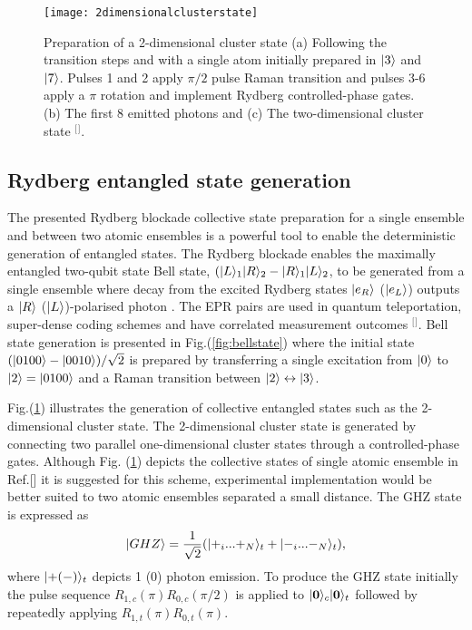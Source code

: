 \begin{figure}[t]
\centering
\texttt{[image: 2dimensionalclusterstate]}
\caption{\label{fig:2dimensionalclusterstate} Preparation of a 2-dimensional cluster state (a) Following the transition steps and with a single atom initially prepared in $\lvert3\rangle$ and $\lvert7\rangle$. Pulses 1 and 2 apply $\pi/2$ pulse Raman transition and pulses 3-6 apply a $\pi$ rotation and implement Rydberg controlled-phase gates. (b) The first 8 emitted photons and (c) The two-dimensional cluster state $^{[}$\citep{Nielsen2010DeterministicProcessing}$^{]}$.}
\end{figure} 

\subsection{Rydberg entangled state generation}

The presented Rydberg blockade collective state preparation for a single ensemble and between two atomic ensembles is a powerful tool to enable the deterministic generation of entangled states. The Rydberg blockade enables the maximally entangled two-qubit state Bell state, $(\lvert L\rangle_{1}\lvert R\rangle_{2}-\lvert R\rangle_{1}\lvert L\rangle_{2}$, to be generated from a single ensemble where decay from the excited Rydberg states $\lvert e_{R}\rangle$ ($\lvert e_{L}\rangle$) outputs a $\lvert R\rangle$ ($\lvert L\rangle$)-polarised photon \citep{Nielsen2010DeterministicProcessing}. The EPR pairs are used in quantum teleportation, super-dense coding schemes and have correlated measurement outcomes $^{[}$\citep{Nielsen2010QuantumInformation}$^{]}$. Bell state generation is presented in Fig.(\ref{fig:bellstate}) where the initial state $(\lvert0100\rangle-\lvert0010\rangle)/\sqrt{2}$ is prepared by transferring a single excitation from $\lvert0\rangle$ to $\lvert2\rangle=\lvert0100\rangle$ and a Raman transition between $\lvert2\rangle \leftrightarrow \lvert3\rangle$.


Fig.(\ref{fig:2dimensionalclusterstate}) illustrates the generation of collective entangled states such as the 2-dimensional cluster state. The 2-dimensional cluster state is generated by connecting two parallel one-dimensional cluster states through a controlled-phase gates. Although Fig. (\ref{fig:2dimensionalclusterstate}) depicts the collective states of single atomic ensemble in Ref.[] it is suggested for this scheme, experimental implementation would be better suited to two atomic ensembles separated a small distance. The GHZ state is expressed as 
\begin{equation}
\label{eq:GHZ}
\lvert GHZ\rangle=\frac{1}{\sqrt{2}}(\lvert+_{i}...+_{N}\rangle_{t}+\lvert-_{i}...-_{N}\rangle_{t}),
\end{equation}
\noindent where $\lvert+(-)\rangle_{t}$ depicts 1 (0) photon emission. To produce the GHZ state initially the pulse sequence $R_{1,c}(\pi)R_{0,c}(\pi/2)$ is applied to $\lvert\textbf{0}\rangle_{c}\lvert\textbf{0}\rangle_{t}$ followed by repeatedly applying $R_{1,t}(\pi)R_{0,t}(\pi)$.  

